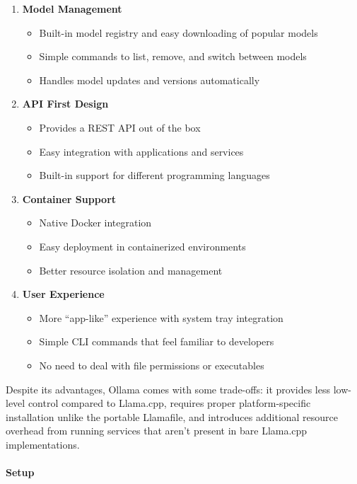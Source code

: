 \begin{enumerate}
\item \textbf{Model Management}
\begin{itemize}
\item Built-in model registry and easy downloading of popular models
\item Simple commands to list, remove, and switch between models
\item Handles model updates and versions automatically
\end{itemize}

\item \textbf{API First Design}
\begin{itemize}
\item Provides a REST API out of the box
\item Easy integration with applications and services
\item Built-in support for different programming languages
\end{itemize}

\item \textbf{Container Support}
\begin{itemize}
\item Native Docker integration
\item Easy deployment in containerized environments
\item Better resource isolation and management
\end{itemize}

\item \textbf{User Experience}
\begin{itemize}
\item More ``app-like'' experience with system tray integration
\item Simple CLI commands that feel familiar to developers
\item No need to deal with file permissions or executables
\end{itemize}
\end{enumerate}

Despite its advantages, Ollama comes with some trade-offs: it provides less low-level control compared to Llama.cpp, requires proper platform-specific installation unlike the portable Llamafile, and introduces additional resource overhead from running services that aren't present in bare Llama.cpp implementations.

\paragraph{Setup}

